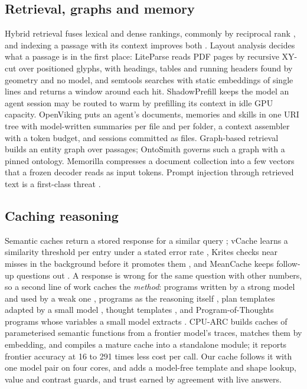 \subsection{Retrieval, graphs and memory}
Hybrid retrieval fuses lexical and dense rankings, commonly by reciprocal rank
\cite{cormack2009rrf}, and indexing a passage with its context improves both
\cite{anthropic2024contextual}. Layout analysis decides what a passage is in
the first place: LiteParse \cite{liteparse2026} reads PDF pages by recursive
XY-cut over positioned glyphs, with headings, tables and running headers found
by geometry and no model, and semtools \cite{semtools2026} searches with
static embeddings of single lines and returns a window around each hit.
ShadowPrefill \cite{qiu2026shadowprefill} keeps the model an agent session may
be routed to warm by prefilling its context in idle GPU capacity. OpenViking \cite{openviking2026} puts an agent's
documents, memories and skills in one URI tree with model-written summaries
per file and per folder, a context assembler with a token budget, and
sessions committed as files. Graph-based retrieval builds an entity graph
over passages; OntoSmith \cite{ontosmith2026} governs such a graph with a
pinned ontology. Memorilla \cite{memorilla2026} compresses a document
collection into a few vectors that a frozen decoder reads as input tokens.
Prompt injection through retrieved text is a first-class threat
\cite{greshake2023injection,perez2022ignore}.

\subsection{Caching reasoning}
Semantic caches return a stored response for a similar query
\cite{bang2023gptcache}; vCache learns a similarity threshold per entry under
a stated error rate \cite{schroeder2026vcache}, Krites checks near misses in
the background before it promotes them \cite{singh2026krites}, and MeanCache
keeps follow-up questions out \cite{gill2025meancache}. A response is wrong for
the same question with other numbers, so a second line of work caches the
\emph{method}: programs written by a strong model and used by a weak one
\cite{cai2024latm,wang2024trove}, programs as the reasoning itself
\cite{gao2023pal,chen2023pot}, plan templates adapted by a small model
\cite{zhang2025apc}, thought templates \cite{yang2024bot}, and Program-of-Thoughts
programs whose variables a small model extracts \cite{chen2026cachespec}.
CPU-ARC \cite{belcak2026cpuarc} builds caches of parameterised semantic
functions from a frontier model's traces, matches them by embedding, and
compiles a mature cache into a standalone module; it reports frontier accuracy
at 16 to 291 times less cost per call. Our cache follows it with one model
pair on four cores, and adds a model-free template and shape lookup, value and
contrast guards, and trust earned by agreement with live answers.
